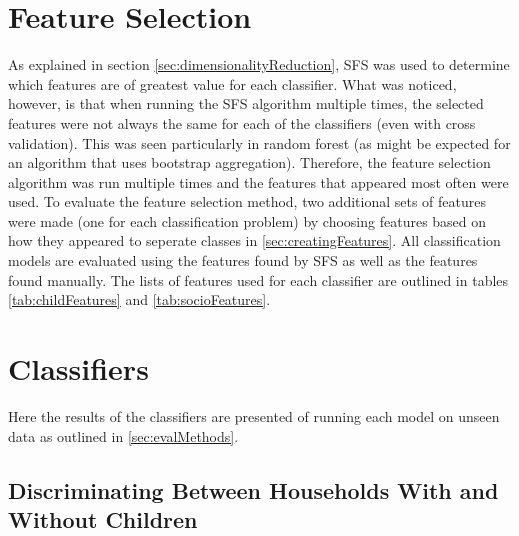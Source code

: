 \section{Feature Selection}

As explained in section \ref{sec:dimensionalityReduction}, SFS was used to determine which features are of greatest value for each classifier. What was noticed, however, is that when running the SFS algorithm multiple times, the selected features were not always the same for each of the classifiers (even with cross validation). This was seen particularly in random forest (as might be expected for an algorithm that uses bootstrap aggregation).  Therefore, the feature selection algorithm was run multiple times and the features that appeared most often were used. To evaluate the feature selection method, two additional sets of features were made (one for each classification problem) by choosing features based on how they appeared to seperate classes in \ref{sec:creatingFeatures}. All classification models are evaluated using the features found by SFS as well as the features found manually. The lists of features used for each classifier are outlined in tables \ref{tab:childFeatures} and \ref{tab:socioFeatures}. 

\childFeatures
\socioFeatures

\section{Classifiers}

Here the results of the classifiers are presented of running each model on unseen data as outlined in \ref{sec:evalMethods}.

\subsection{Discriminating Between Households With and Without Children}
